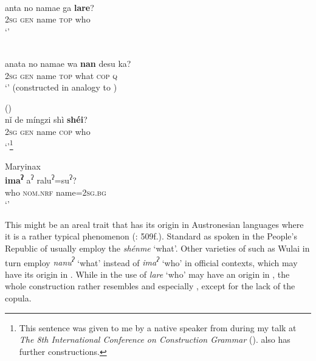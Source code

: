 \ea%
    \label{ex:japa:54}
    \\
    \gll anta no namae ga \textbf{{lare}}?\\
    2\textsc{sg}  \textsc{gen}  name  \textsc{top}  who\\
    \glt ‘’ \citep[54]{Peng2015}
    \z

\ea%
    \label{ex:japa:55}
    \\
    \gll anata  no  namae  wa \textbf{{nan}} desu  ka?\\
    2\textsc{sg}  \textsc{gen}  name  \textsc{top}  what  \textsc{cop}  \textsc{q}\\
    \glt ‘’ (constructed in analogy to )
    \z

\ea%
    \label{ex:japa:56}
      ()\\
    \gll nǐ  de  míngzi  shì \textbf{{shéi}}?\\
    2\textsc{sg}  \textsc{gen}  name  \textsc{cop}  who\\
    \glt ‘’\footnote{This sentence was given to me by a native speaker from  during my talk at \textit{The 8th International Conference on Construction Grammar} (\citealt{Hölzl2014b}).  also has further constructions.}
    \z

\ea%
    \label{ex:japa:57}
    Maryinax \\
    \gll \textbf{{ima}}\textbf{{\textsuperscript{ʔ}}} {a\textsuperscript{ʔ}} {ralu\textsuperscript{ʔ}}{=su\textsuperscript{ʔ}}?\\
    who  \textsc{nom}.\textsc{nrf}  name=2\textsc{sg}.\textsc{bg}\\
    \glt ‘’ \citep[271]{Huang1996}
    \z

\noindent This might be an areal trait that has its origin in Austronesian languages where it is a rather typical phenomenon (\citealt{Blust2013}: 509f.). Standard  as spoken in the People’s Republic of  usually employ the  \textit{shénme} ‘what’. Other varieties of  such as Wulai in turn employ \textit{nanu\textsuperscript{ʔ}} ‘what’ instead of \textit{ima\textsuperscript{ʔ}} ‘who’ in official contexts, which may have its origin in  \citep[293]{Huang1996}. While in  the use of \textit{lare} ‘who’ may have an origin in , the whole construction rather resembles  and especially , except for the lack of the copula.